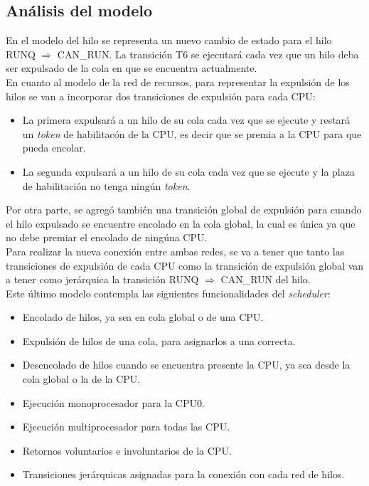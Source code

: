 \documentclass[a4paper]{book}
\begin{document}
\subsection{An\'alisis del modelo}
En el modelo del hilo se representa un nuevo cambio de estado para el hilo RUNQ $\Rightarrow$ CAN\_RUN. La transici\'on T6 se ejecutar\'a cada vez que un hilo deba ser expulsado de la cola en que se encuentra actualmente.\\

En cuanto al modelo de la red de recursos, para representar la expulsi\'on de los hilos se van a incorporar dos transiciones de expulsi\'on para cada CPU:
\begin{itemize}
\item La primera expulsar\'a a un hilo de su cola cada vez que se ejecute y restará un \emph{token} de habilitac\'on de la CPU, es decir que se premia a la CPU para que pueda encolar.
\item La segunda expulsar\'a a un hilo de su cola cada vez que se ejecute y la plaza de habilitaci\'on no tenga ning\'un \emph{token}.
\end{itemize}

Por otra parte, se agreg\'o tambi\'en una transici\'on global de expulsi\'on para cuando el hilo expulsado se encuentre encolado en la cola global, la cual es \'unica ya que no debe premiar el encolado de ning\'una CPU.\\

Para realizar la nueva conexi\'on entre ambas redes, se va a tener que tanto las transiciones de expulsi\'on de cada CPU como la transici\'on de expulsi\'on global van a tener como jer\'arquica la transici\'on RUNQ $\Rightarrow$ CAN\_RUN del hilo.\\

Este \'ultimo modelo contempla las siguientes funcionalidades del \emph{scheduler}:
\begin{itemize}
\item Encolado de hilos, ya sea en cola global o de una CPU.
\item Expulsi\'on de hilos de una cola, para asignarlos a una correcta.
\item Desencolado de hilos cuando se encuentra presente la CPU, ya sea desde la cola global o la de la CPU.
\item Ejecuci\'on monoprocesador para la CPU0.
\item Ejecuci\'on multiprocesador para todas las CPU.
\item Retornos voluntarios e involuntarios de la CPU.
\item Transiciones jer\'arquicas asignadas para la conexi\'on con cada red de hilos.
\end{itemize}
\end{document}
